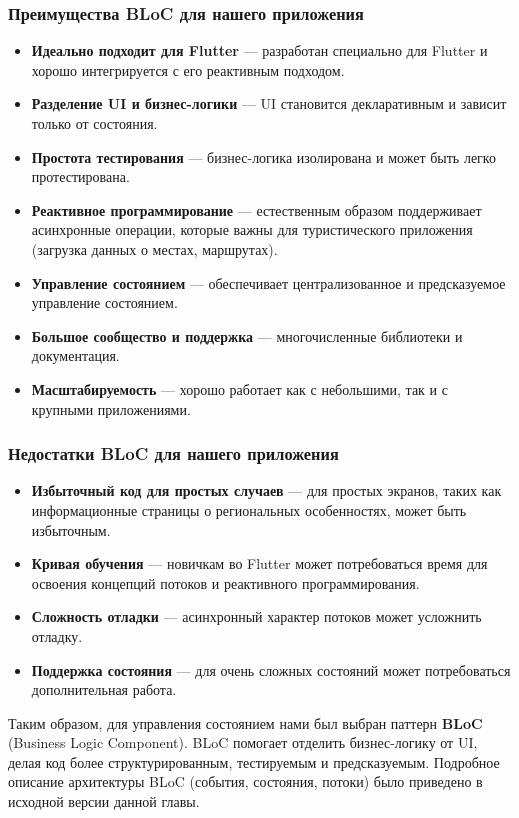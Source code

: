 \subsubsection*{Преимущества BLoC для нашего приложения}
\begin{itemize}
    \item \textbf{Идеально подходит для Flutter} — разработан специально для Flutter и хорошо интегрируется с его реактивным подходом.
    \item \textbf{Разделение UI и бизнес-логики} — UI становится декларативным и зависит только от состояния.
    \item \textbf{Простота тестирования} — бизнес-логика изолирована и может быть легко протестирована.
    \item \textbf{Реактивное программирование} — естественным образом поддерживает асинхронные операции, которые важны для туристического приложения (загрузка данных о местах, маршрутах).
    \item \textbf{Управление состоянием} — обеспечивает централизованное и предсказуемое управление состоянием.
    \item \textbf{Большое сообщество и поддержка} — многочисленные библиотеки и документация.
    \item \textbf{Масштабируемость} — хорошо работает как с небольшими, так и с крупными приложениями.
\end{itemize}

\subsubsection*{Недостатки BLoC для нашего приложения}
\begin{itemize}
    \item \textbf{Избыточный код для простых случаев} — для простых экранов, таких как информационные страницы о региональных особенностях, может быть избыточным.
    \item \textbf{Кривая обучения} — новичкам во Flutter может потребоваться время для освоения концепций потоков и реактивного программирования.
    \item \textbf{Сложность отладки} — асинхронный характер потоков может усложнить отладку.
    \item \textbf{Поддержка состояния} — для очень сложных состояний может потребоваться дополнительная работа.
\end{itemize}


Таким образом, для управления состоянием нами был выбран паттерн \textbf{BLoC} (Business Logic Component). BLoC помогает отделить бизнес-логику от UI, делая код более структурированным, тестируемым и предсказуемым. Подробное описание архитектуры BLoC (события, состояния, потоки) было приведено в исходной версии данной главы.

